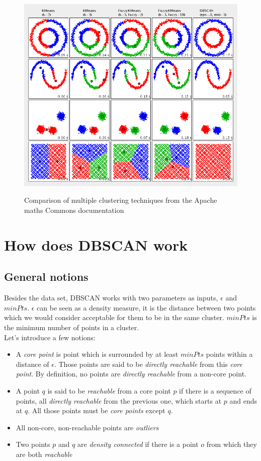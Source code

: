 \begin{figure}
\centering
{\includegraphics[width=6in]{images/cluster_comparison.png}}
\caption{Comparison of multiple clustering techniques from the Apache maths Commons documentation\cite{apachecluster}}
\label{fig:clustComp}
\end{figure}
\newcommand\minpts{\mathit{minPts}}
\section{How does DBSCAN work}
\subsection{General notions}
Besides the data set, DBSCAN works with two parameters as inputs, $\epsilon$ and $\minpts$. $\epsilon$ can be seen as a density measure, it is the distance between two points which we would consider acceptable for them to be in the same cluster. $\minpts$ is the minimum number of points in a cluster.\\
Let's introduce a few notions\cite{dbscan}:
\begin{itemize}
	\item A \emph{core point} is point which is surrounded by at least $\minpts$ points within a distance of $\epsilon$. Those points are said to be \emph{directly reachable} from this \emph{core point}. By definition, no points are \emph{directly reachable} from a non-core point.
	\item A point $q$ is said to be \emph{reachable} from a core point $p$ if there is a sequence of points, all \emph{directly reachable} from the previous one, which starts at $p$ and ends at $q$. All those points must be \emph{core points} except $q$.
	\item All non-core, non-reachable points are \emph{outliers}
	\item Two points $p$ and $q$ are \emph{density connected} if there is a point $o$ from which they are both \emph{reachable}
\end{itemize}

